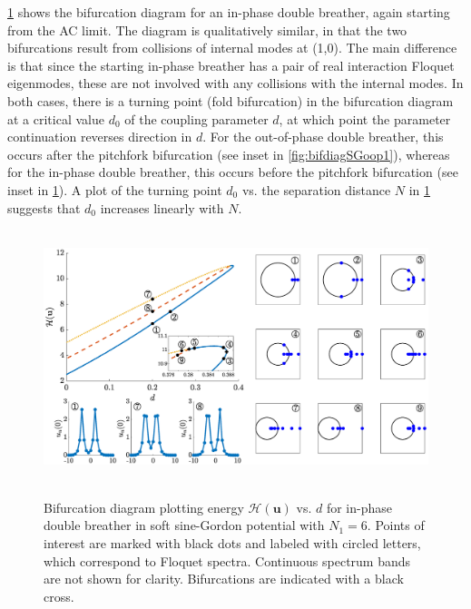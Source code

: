 \documentclass[12pt,reqno]{amsart}
\newcommand{\uvec}{\mathbf{u}}
\theoremstyle{definition}
\begin{document}
\cref{fig:bifdiagSGip1} shows the bifurcation diagram for an in-phase double breather, again starting from the AC limit. The diagram is qualitatively similar, in that the two bifurcations result from collisions of internal modes at (1,0). The main difference is that since the starting in-phase breather has a pair of real interaction Floquet eigenmodes, these are not involved with any collisions with the internal modes. In both cases, there is a turning point (fold bifurcation) in the bifurcation diagram at a critical value $d_0$ of the coupling parameter $d$, at which point the parameter continuation reverses direction in $d$. For the out-of-phase double breather, this occurs after the pitchfork bifurcation (see inset in \cref{fig:bifdiagSGoop1}), whereas for the in-phase double breather, this occurs before the pitchfork bifurcation (see inset in \cref{fig:bifdiagSGip1}). A plot of the turning point $d_0$ vs. the separation distance $N$ in \cref{fig:bifdiagSGip1} suggests that $d_0$ increases linearly with $N$.

\begin{figure}
	\hbox{
	\hspace{-2cm}
	\includegraphics[width=20cm]{bifdiagSGinphaseN6.eps} 
	}
	\caption{Bifurcation diagram plotting energy $\mathcal{H}(\uvec)$ vs. $d$ for in-phase double breather in soft sine-Gordon potential with $N_1 = 6$. Points of interest are marked with black dots and labeled with circled letters, which correspond to Floquet spectra. Continuous spectrum bands are not shown for clarity. Bifurcations are indicated with a black cross. }
	\label{fig:bifdiagSGip1}
\end{figure}
\end{document}
